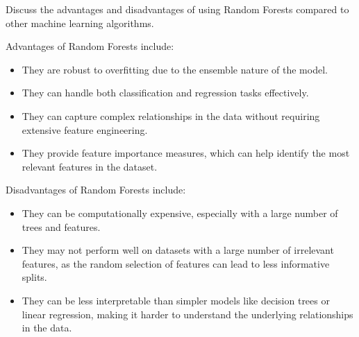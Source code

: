 \begin{ejercicio}
    Discuss the advantages and disadvantages of using Random Forests compared to other machine learning algorithms.

    Advantages of Random Forests include:
    \begin{itemize}
        \item They are robust to overfitting due to the ensemble nature of the model.
        \item They can handle both classification and regression tasks effectively.
        \item They can capture complex relationships in the data without requiring extensive feature engineering.
        \item They provide feature importance measures, which can help identify the most relevant features in the dataset.
    \end{itemize}

    Disadvantages of Random Forests include:
    \begin{itemize}
        \item They can be computationally expensive, especially with a large number of trees and features.
        \item They may not perform well on datasets with a large number of irrelevant features, as the random selection of features can lead to less informative splits.
        \item They can be less interpretable than simpler models like decision trees or linear regression, making it harder to understand the underlying relationships in the data.
    \end{itemize}
\end{ejercicio}